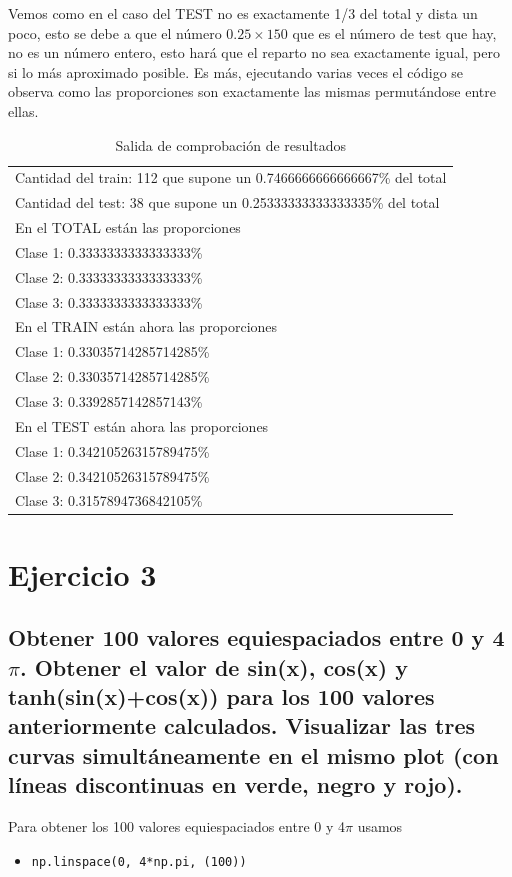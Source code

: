 \documentclass[11pt,a4paper]{report}
\newcommand\tab[1][1cm]{\hspace*{#1}}
\begin{document}
Vemos como en el caso del TEST no es exactamente 1/3 del total y dista un poco, esto se debe a que el número $0.25\times150$ que es el número de test que hay, no es un número entero, esto hará que el reparto no sea exactamente igual, pero si lo más aproximado posible. Es más, ejecutando varias veces el código se observa como las proporciones son exactamente las mismas permutándose entre ellas.

\begin{table}[htb]

\centering
\begin{tabular}{|l|}

\hline
	Cantidad del train: 112 que supone un 0.7466666666666667\% del total\\
Cantidad del test: 38 que supone un 0.25333333333333335\% del total\\
En el TOTAL están las proporciones\\
   \tab Clase 1: 0.3333333333333333\%\\
   \tab Clase 2: 0.3333333333333333\%\\
   \tab Clase 3: 0.3333333333333333\%\\
En el TRAIN están ahora las proporciones\\
   \tab Clase 1: 0.33035714285714285\%\\
   \tab Clase 2: 0.33035714285714285\%\\
   \tab Clase 3: 0.3392857142857143\%\\
En el TEST están ahora las proporciones\\
   \tab Clase 1: 0.34210526315789475\%\\
   \tab Clase 2: 0.34210526315789475\%\\
   \tab Clase 3: 0.3157894736842105\%\\
\hline
\end{tabular}
\label{t:salida}
\caption{Salida de comprobación de resultados}
\end{table}

\section*{Ejercicio 3}
\subsection*{Obtener 100 valores equiespaciados entre 0 y 4$\pi$. Obtener el valor de sin(x), cos(x) y tanh(sin(x)+cos(x)) para los 100 valores anteriormente calculados. Visualizar las tres curvas simultáneamente en el mismo plot (con líneas discontinuas en verde, negro y rojo).}
Para obtener los 100 valores equiespaciados entre 0 y 4$\pi$ usamos 
\begin{itemize}
\item \texttt{np.linspace(0, 4*np.pi, (100))}
\end{itemize}
\end{document}
